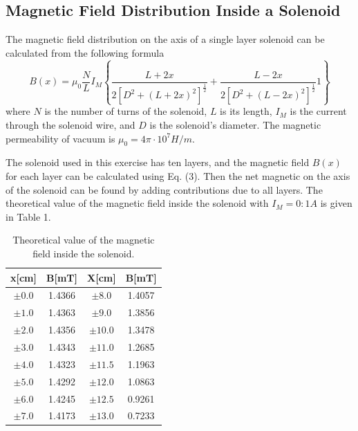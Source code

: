 \documentclass[12pt]{article}
\begin{document}
\subsection{Magnetic Field Distribution Inside a Solenoid}
The magnetic field distribution on the axis of a single layer solenoid can be calculated
from the following formula
\begin{equation}
B(x)=\mu_0\frac{N}{L}I_M\left\{\frac{L+2x}{2[D^2+(L+2x)^2]^\frac{1}{2}}+\frac{L-2x}{2[D^2+(L-2x)^2]^\frac{1}{2}}1\right\}
\end{equation}
where $N$ is the number of turns of the solenoid, $L$ is its length, $I_M$ is the current through the solenoid wire, and $D$ is the solenoid's diameter. The magnetic permeability of vacuum is $\mu_0=4\pi\cdot10^7H/m$.
\par The solenoid used in this exercise has ten layers, and the magnetic field $B(x)$ for
each layer can be calculated using Eq. (3). Then the net magnetic on the axis of the
solenoid can be found by adding contributions due to all layers. The theoretical value of
the magnetic field inside the solenoid with $I_M = 0:1 A$ is given in Table 1.
\begin{table}[H]
\centering
\begin{tabular}{|c|c|c|c|}
\hline
x[cm] & B[mT]  & X[cm] & B[mT]  \\ \hline
$\pm0.0$   	  & 1.4366 &$\pm8.0$       & 1.4057 \\ \hline
$\pm1.0$ 	  & 1.4363 &$\pm9.0$       & 1.3856 \\ \hline
$\pm2.0$      & 1.4356 &$\pm10.0$       & 1.3478 \\ \hline
$\pm3.0$      & 1.4343 &$\pm11.0$       & 1.2685 \\ \hline
$\pm4.0$      & 1.4323 &$\pm11.5$       & 1.1963 \\ \hline
$\pm5.0$      & 1.4292 &$\pm12.0$      & 1.0863 \\ \hline
$\pm6.0$      & 1.4245 &$\pm12.5$       & 0.9261 \\ \hline
$\pm7.0$      & 1.4173 &$\pm13.0$       & 0.7233 \\ \hline
\end{tabular}
\caption{Theoretical value of the magnetic field inside the solenoid.}
\end{table}
\end{document}
